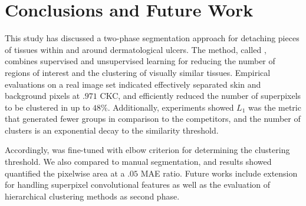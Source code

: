 \section{Conclusions and Future Work}

This study has discussed a two-phase segmentation approach for detaching pieces of tissues within and around dermatological ulcers.
The method, called \system, combines supervised and unsupervised learning for reducing the number of regions of interest and the clustering of visually similar tissues.
Empirical evaluations on a real image set indicated \system effectively separated skin and background pixels at $.971$ CKC, and efficiently reduced the number of superpixels to be clustered in up to $48\%$.
Additionally, experiments showed $L_1$ was the metric that generated fewer groups in comparison to the competitors, and the number of clusters is an exponential decay to the similarity threshold.

Accordingly, \system was fine-tuned with elbow criterion for determining the clustering threshold.
We also compared \system to manual segmentation, and results showed \system quantified the pixelwise area at a $.05$ MAE ratio.
Future works include \system extension for handling superpixel convolutional features as well as the evaluation of hierarchical clustering methods as \system second phase.

